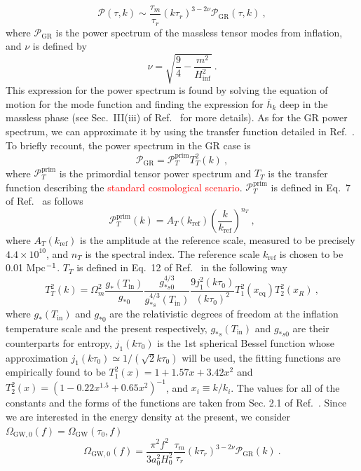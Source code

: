 \documentclass[prd,twocolumn,aps,psfig,nofootinbib,nobibnotes,superscriptaddress,preprintnumbers,times]{revtex4-2}
\def\red{\textcolor{red}}
\begin{document}
\begin{equation}\label{eqn:p_sfm}
    \mathcal{P}(\tau, k) \sim \frac{\tau_m}{\tau_r}(k\tau_r)^{3-2\nu}\mathcal{P}_{\text{GR}}(\tau,k)\ , 
\end{equation}
where $\mathcal{P}_{\text{GR}}$ is the power spectrum of the massless tensor modes from inflation, and $\nu$ is defined by 
\begin{equation}\label{eqn:nu}
    \nu = \sqrt{\frac{9}{4} - \frac{m^2}{H_{\inf}^2}}\ .
\end{equation}
This expression for the power spectrum is found by solving the equation of motion for the mode function and finding the expression for $\overline{h}_k$ deep in the massless phase (see Sec.\ III(iii) of Ref.\ \cite{Fujita:2018ehq} for more details). As for the GR power spectrum, we can approximate it by using the transfer function detailed in Ref.\ \cite{Kuroyanagi:2014nba}. To briefly recount, the power spectrum in the GR case is 
\begin{equation}\label{eqn:p_gr_sfm}
    \mathcal{P}_{\text{GR}} = \mathcal{P}^{\text{prim}}_{T} T^2_T(k) \ ,
\end{equation}
where $\mathcal{P}^{\text{prim}}_{T}$ is the primordial tensor power spectrum 
and $T_{T}$ is the transfer function describing the \red{standard cosmological scenario}. $\mathcal{P}^{\text{prim}}_{T}$ is defined in Eq.\ 7 of Ref.\ \cite{Kuroyanagi:2014nba} as follows
\begin{equation}\label{eqn:pt}
    \mathcal{P}_{T}^{\text{prim}}(k) = A_T(k_{\text{ref}})\left(\frac{k}{k_{\text{ref}}}\right)^{n_T} \ ,
\end{equation}
where $A_T(k_{\text{ref}})$ is the amplitude at the reference scale,
\hspace{-1em}measured to be precisely $4.4\times 10^{10}$, and $n_T$ is the spectral index. The reference scale $k_{\text{ref}}$ is chosen to be 0.01 Mpc$\/^{-1}$. $T_{T}$ is defined in Eq.\ 12 of Ref.\ \cite{Kuroyanagi:2014nba} in the following way
\begin{equation}\label{eqn:tt}
    T_T^2(k) = \Omega_m^2 \frac{g_*(T_\text{in})}{g_{*0}} \frac{g_{*s0}^{4/3}}{g_{*s}^{4/3}(T_{\text{in}})} \frac{9j_1^2(k\tau_0)}{(k\tau_0)^2}T_1^2(x_{\text{eq}}) T_2^2(x_R) \ ,
\end{equation}
where $g_{*}(T_\text{in})$ and $g_{*0}$ are the relativistic degrees of freedom at the inflation temperature scale and the present respectively, $g_{*s}(T_\text{in})$ and $g_{*s0}$ are their counterparts for entropy, $j_1(k\tau_0)$ is the 1st spherical Bessel function whose approximation $j_1(k\tau_0) \simeq 1/(\sqrt{2}k\tau_0)$ will be used, the fitting functions are empirically found to be $T_1^2(x) = 1+1.57x+3.42x^2$ and $T_2^2(x) = (1-0.22x^{1.5} + 0.65x^2)^{-1}$, and $x_i \equiv k/k_i$. The values for all of the constants and the forms of the functions are taken from Sec. 2.1 of Ref.\ \cite{Kuroyanagi:2014nba}. 
Since we are interested in the energy density at the present, we consider $\Omega_{\text{GW},0}(f) = \Omega_\text{GW}(\tau_0,f)$
\begin{equation}\label{eqn:om_gw_0}
    \Omega_{\text{GW},0}(f) = \frac{\pi^2f^2}{3a_0^2 H_0^2}\frac{\tau_m}{\tau_r}(k\tau_r)^{3-2\nu}\mathcal{P}_{\text{GR}}(k) \ .
\end{equation}
\end{document}
